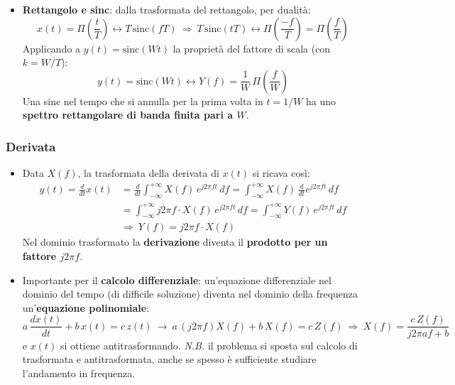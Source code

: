 \documentclass[12pt, a4paper]{article}
\begin{document}
\begin{itemize}
\begin{itemize}
        $$X(f)=\mathcal{F}\left\{\sum_{n=-\infty}^{+\infty}\frac1T\,e^{j\frac{2\pi nt}{T}}\right\}=\frac1T\sum_{n=-\infty}^{+\infty}\mathcal{F}\left\{e^{j\frac{2\pi nt}{T}}\right\}=\frac1T\sum_{n=-\infty}^{+\infty}\delta\!\left(f-\frac nT\right)$$
        La trasformata di un treno di impulsi è a sua volta un \textbf{treno di impulsi}. Tanto più ravvicinati sono gli impulsi nel tempo, tanto più distanti saranno nel dominio della frequenza, e viceversa.
        \item \textbf{Rettangolo e sinc}: dalla trasformata del rettangolo, per dualità:
        $$x(t)=\Pi\!\left(\frac tT\right)\longleftrightarrow T\,\text{sinc}(fT)\ \Longrightarrow\ T\,\text{sinc}(tT)\longleftrightarrow\Pi\!\left(\frac{-f}{T}\right)=\Pi\!\left(\frac fT\right)$$
        Applicando a $y(t)=\text{sinc}(Wt)$ la proprietà del fattore di scala (con $k=W/T$):
        $$y(t)=\text{sinc}(Wt)\longleftrightarrow Y(f)=\frac1W\,\Pi\!\left(\frac fW\right)$$
        Una sinc nel tempo che si annulla per la prima volta in $t=1/W$ ha uno \textbf{spettro rettangolare di banda finita pari a $W$}.
    \end{itemize}
\end{itemize}

\subsubsection{Derivata}
\begin{itemize}
    \item Data $X(f)$, la trasformata della derivata di $x(t)$ si ricava così:
    \begin{align*}
        y(t)=\frac{d}{dt}x(t)&=\frac{d}{dt}\int_{-\infty}^{+\infty}X(f)\,e^{j2\pi ft}\,df=\int_{-\infty}^{+\infty}X(f)\,\frac{d}{dt}e^{j2\pi ft}\,df\\
        &=\int_{-\infty}^{+\infty}j2\pi f\cdot X(f)\,e^{j2\pi ft}\,df=\int_{-\infty}^{+\infty}Y(f)\,e^{j2\pi ft}\,df\\
        &\Longrightarrow\ Y(f)=j2\pi f\cdot X(f)
    \end{align*}
    Nel dominio trasformato la \textbf{derivazione} diventa il \textbf{prodotto per un fattore $j2\pi f$}.
    \item Importante per il \textbf{calcolo differenziale}: un'equazione differenziale nel dominio del tempo (di difficile soluzione) diventa nel dominio della frequenza un'\textbf{equazione polinomiale}:
    $$a\,\frac{dx(t)}{dt}+b\,x(t)=c\,z(t)\ \longrightarrow\ a\,(j2\pi f)X(f)+b\,X(f)=c\,Z(f)\ \Longrightarrow\ X(f)=\frac{c\,Z(f)}{j2\pi af+b}$$
    e $x(t)$ si ottiene antitrasformando. \textit{N.B.} il problema si sposta sul calcolo di trasformata e antitrasformata, anche se spesso è sufficiente studiare l'andamento in frequenza.
\end{itemize}
\end{document}
